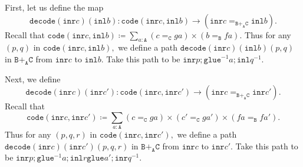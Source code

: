 \message{ !name(notes.tex)}\documentclass[12pt]{amsart}
\newcommand{\from}{\colon}
\newcommand{\inv}{^{-1}}
\newcommand{\bydef}{\coloneqq}
\newcommand{\type}[1]{\mathtt{#1}}
\newcommand{\tin}{\colon}
\newcommand{\A}{\type{A}}
\newcommand{\B}{\type{B}}
\newcommand{\C}{\type{C}}
\newcommand{\BAC}{\B +_{\A} \C}
\newcommand{\inl}{\type{inl}}
\newcommand{\inr}{\type{inr}}
\newcommand{\glue}{\type{glue}}
\newcommand{\code}{\type{code}}
\newcommand{\decode}{\type{decode}}
\theoremstyle{remark}
\theoremstyle{definition}
\begin{document}

First, let us define the map
\[
  \decode ( \inr c ) ( \inl b ) \from
    \code ( \inr c , \inl b ) \to
    ( \inr c =_{\BAC} \inl b ).
\]
Recall that
\(
  \code ( \inr c , \inl b ) \coloneqq
    \sum\limits_{a \tin \A}
    ( c =_{\C} ga ) \times ( b =_{\B} fa ).
\)
Thus for any \( ( p,q ) \) in
\(
  \code ( \inr c , \inl b ),
\)
we define a path
\(
  \decode ( \inr c ) ( \inl b ) ( p,q )
\)
in \( \BAC \) from \( \inr c \) to  \( \inl b \). Take this path to be
\(
  \inr p ; \glue^{-1}  a ; \inl q^{-1}.
\)


Next, we define
\[
  \decode ( \inr c ) ( \inr c' ) \from
  \code ( \inr c , \inr c' ) \to
  ( \inr c =_{\BAC} \inr c' ).
\]
Recall that
\[
  \code ( \inr c , \inr c' ) \bydef
  \sum\limits_{a \tin \A}
  ( c =_{\C} ga ) \times ( c' =_{\C} ga' ) \times ( fa =_{\B} fa' ). 
\]
Thus for any \( ( p,q,r ) \) in
\(
  \code ( \inr c , \inr c' ),
\)
we define a path
\(
  \decode ( \inr c ) ( \inr c' ) ( p,q,r )
\)
in \( \BAC \) from \( \inr c \) to \( \inr c' \). Take this path to be
\(
  \inr p ; \glue\inv a ; \inl r \glue a' ; \inr q\inv.
\)

\end{document}
